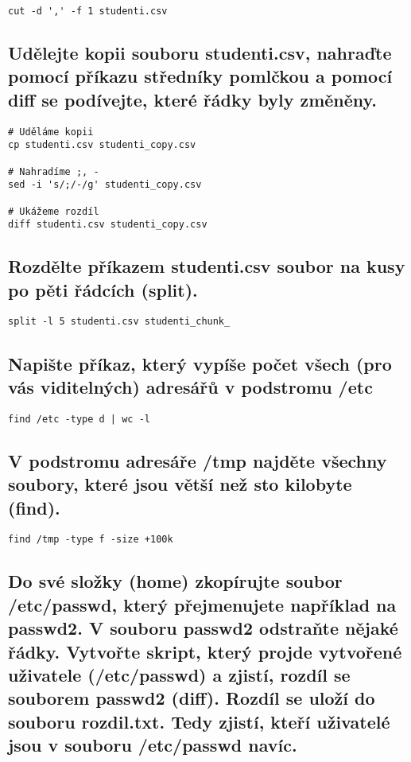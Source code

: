 \documentclass{article}
\begin{document}
\begin{lstlisting}
cut -d ',' -f 1 studenti.csv
\end{lstlisting}

\subsection{Udělejte kopii souboru studenti.csv, nahraďte pomocí příkazu středníky pomlčkou a pomocí diff se podívejte, které řádky byly změněny.}

\begin{lstlisting}
# Uděláme kopii
cp studenti.csv studenti_copy.csv 

# Nahradíme ;, -
sed -i 's/;/-/g' studenti_copy.csv

# Ukážeme rozdíl
diff studenti.csv studenti_copy.csv
\end{lstlisting}

\subsection{Rozdělte příkazem  studenti.csv soubor na kusy po pěti řádcích (split).}

\begin{lstlisting}
split -l 5 studenti.csv studenti_chunk_
\end{lstlisting}

\subsection{Napište příkaz, který vypíše počet všech (pro vás viditelných) adresářů v podstromu /etc}

\begin{lstlisting}
find /etc -type d | wc -l
\end{lstlisting}

\subsection{V podstromu adresáře /tmp najděte všechny soubory, které jsou větší než sto kilobyte (find).}

\begin{lstlisting}
find /tmp -type f -size +100k
\end{lstlisting}

\subsection{Do své složky (home) zkopírujte soubor /etc/passwd, který přejmenujete například na passwd2. V souboru passwd2 odstraňte nějaké řádky. Vytvořte skript, který projde vytvořené uživatele (/etc/passwd)  a  zjistí, rozdíl se souborem passwd2 (diff). Rozdíl se uloží do souboru rozdil.txt. Tedy zjistí, kteří uživatelé jsou v souboru /etc/passwd navíc.}
\end{document}
